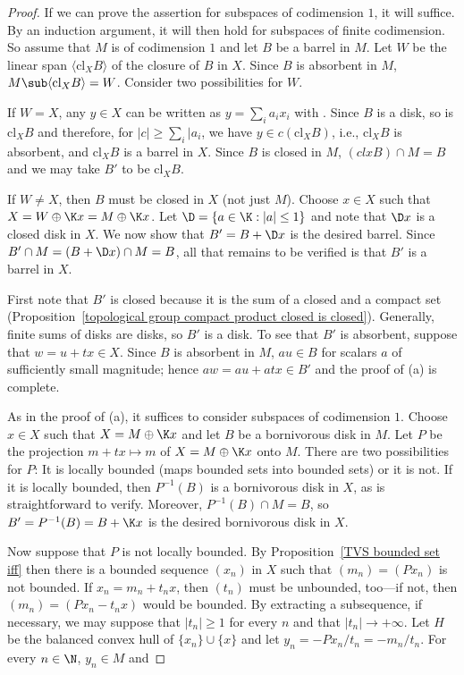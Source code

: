 \begin{proof}
If we can prove the assertion for subspaces of codimension $1$, it will suffice. By an induction argument, it will then hold for subspaces of finite codimension. So assume that $M$ is of codimension $1$ and let $B$ be a barrel in $M$. Let $W$ be the linear span $\langle\mathrm{cl}_XB\rangle$ of the closure of $B$ in $X$. Since $B$ is absorbent in $M$, $M\sub\langle\mathrm{cl}_XB\rangle=W$. Consider two possibilities for $W$.\par
If $W=X$, any $y\in X$ can be written as $y=\sum_ia_ix_i$ with . Since $B$ is a disk, so is $\mathrm{cl}_XB$ and therefore, for $|c|\geq\sum_i|a_i$, we have $y\in c(\mathrm{cl}_XB)$, i.e., $\mathrm{cl}_XB$ is absorbent, and $\mathrm{cl}_XB$ is a barrel in $X$. Since $B$ is closed in $M$, $(clx B)\cap M=B$ and we may take $B'$ to be $\mathrm{cl}_XB$.\par
If $W\neq X$, then $B$ must be closed in $X$ (not just $M$). Choose $x\in X$ such that $X=W\oplus\K x=M\oplus\K x$. Let $\D=\{a\in\K:|a|\leq 1\}$ and note that $\D x$ is a closed disk in $X$. We now show that $B'=B+\D x$ is the desired barrel. Since $B'\cap M=(B+\D x)\cap M=B$, all that remains to be verified is that $B'$ is a barrel in $X$.\par
First note that $B'$ is closed because it is the sum of a closed and a compact set (Proposition~\ref{topological group compact product closed is closed}). Generally, finite sums of disks are disks, so $B'$ is a disk. To see that $B'$ is absorbent, suppose that $w=u+tx\in X$. Since $B$ is absorbent in $M$, $au\in B$ for scalars $a$ of sufficiently small magnitude; hence $aw=au+atx\in B'$ and the proof of (a) is complete.\par
As in the proof of (a), it suffices to consider subspaces of codimension $1$. Choose $x\in X$ such that $X=M\oplus\K x$ and let $B$ be a bornivorous disk in $M$. Let $P$ be the projection $m+tx\mapsto m$ of $X=M\oplus\K x$ onto $M$. There are two possibilities for $P$: It is locally bounded (maps bounded sets into bounded sets) or it is not. If it is locally bounded, then $P^{-1}(B)$ is a bornivorous disk in $X$, as is straightforward to verify. Moreover, $P^{-1}(B)\cap M=B$, so $B'=P^{-1}(B)=B+\K x$ is the desired bornivorous disk in $X$.\par
Now suppose that $P$ is not locally bounded. By Proposition~\ref{TVS bounded set iff} then there is a bounded sequence $(x_n)$ in $X$ such that $(m_n)=(Px_n)$ is not bounded. If $x_n=m_n+t_nx$, then $(t_n)$ must be unbounded, too---if not, then $(m_n)=(Px_n-t_nx)$ would be bounded. By extracting a subsequence, if necessary, we may suppose that $|t_n|\geq 1$ for every $n$ and that $|t_n|\to+\infty$. Let $H$ be the balanced convex hull of $\{x_n\}\cup\{x\}$ and let $y_n=-Px_n/t_n=-m_n/t_n$. For every $n\in\N$, $y_n\in M$ and

\end{proof}
